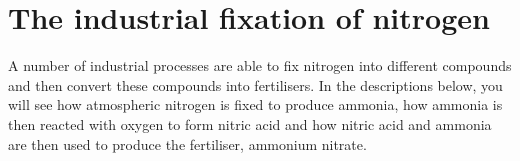 



\section{The industrial fixation of nitrogen}
\label{sec:global cycles:industrial fixation}

A number of industrial processes are able to fix nitrogen into different compounds and then convert these compounds into fertilisers. In the descriptions below, you will see how atmospheric nitrogen is fixed to produce ammonia, how ammonia is then reacted with oxygen to form nitric acid and how nitric acid and ammonia are then used to produce the fertiliser, ammonium nitrate.

